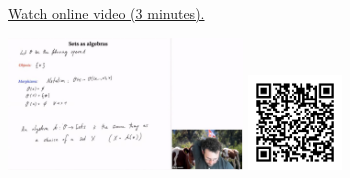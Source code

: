 
\begin{minipage}{10cm}
    \href{https://act4e-spring21.netlify.app/videos/spring2021-operads-b:sets-algebras.html}{Watch online video (3 minutes).}
        
    \href{https://act4e-spring21.netlify.app/videos/spring2021-operads-b:sets-algebras.html}{\includegraphics[height=3.5cm]{spring2021-operads-b:sets-algebras/thumbnails.jpg}}
    \href{https://act4e-spring21.netlify.app/videos/spring2021-operads-b:sets-algebras.html}{\includegraphics[height=2.5cm]{spring2021-operads-b:sets-algebras/qrcode.png}}
\end{minipage}
